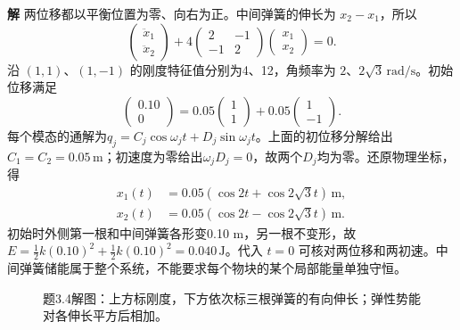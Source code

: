\documentclass[11pt,openany,fontset=fandol]{ctexbook}
\theoremstyle{plain}\newtheorem{theorem}{定理}[chapter]\newtheorem{proposition}[theorem]{命题}
\theoremstyle{definition}\newtheorem{definition}{定义}[chapter]\newtheorem{example}{例}[chapter]
\theoremstyle{remark}\newtheorem*{remark}{说明}
\newcommand{\SolutionStart}{\par\nobreak\medskip\nobreak\noindent\textbf{解}\quad\ignorespaces}
\newenvironment{solution}{\SolutionStart}{\par\medskip}
\begin{document}
\begin{enumerate}[label=3.\arabic*]
\begin{solution}
两位移都以平衡位置为零、向右为正。中间弹簧的伸长为 $x_2-x_1$，所以
\[
\begin{pmatrix}\ddot x_1\\\ddot x_2\end{pmatrix}
+4\begin{pmatrix}2&-1\\-1&2\end{pmatrix}
\begin{pmatrix}x_1\\x_2\end{pmatrix}=0.
\]
沿 $(1,1)$、$(1,-1)$ 的刚度特征值分别为4、12，角频率为 $2$、$2\sqrt3\,\mathrm{rad/s}$。初始位移满足
\[
\begin{pmatrix}0.10\\0\end{pmatrix}
=0.05\begin{pmatrix}1\\1\end{pmatrix}
+0.05\begin{pmatrix}1\\-1\end{pmatrix}.
\]
每个模态的通解为$q_j=C_j\cos\omega_jt+D_j\sin\omega_jt$。上面的初位移分解给出$C_1=C_2=0.05\,\mathrm m$；初速度为零给出$\omega_jD_j=0$，故两个$D_j$均为零。还原物理坐标，得
\begin{align*}
x_1(t)&=0.05(\cos2t+\cos2\sqrt3t)\,\mathrm m,\\
x_2(t)&=0.05(\cos2t-\cos2\sqrt3t)\,\mathrm m.
\end{align*}
初始时外侧第一根和中间弹簧各形变0.10 m，另一根不变形，故 $E=\tfrac12k(0.10)^2+\tfrac12k(0.10)^2=0.040\,\mathrm J$。代入 $t=0$ 可核对两位移和两初速。中间弹簧储能属于整个系统，不能要求每个物块的某个局部能量单独守恒。

\begin{figure}[H]\centering
{}
\caption{题3.4解图：上方标刚度，下方依次标三根弹簧的有向伸长；弹性势能对各伸长平方后相加。}\label{fig:ex-3-4}
\end{figure}


\end{solution}
\end{enumerate}
\end{document}
